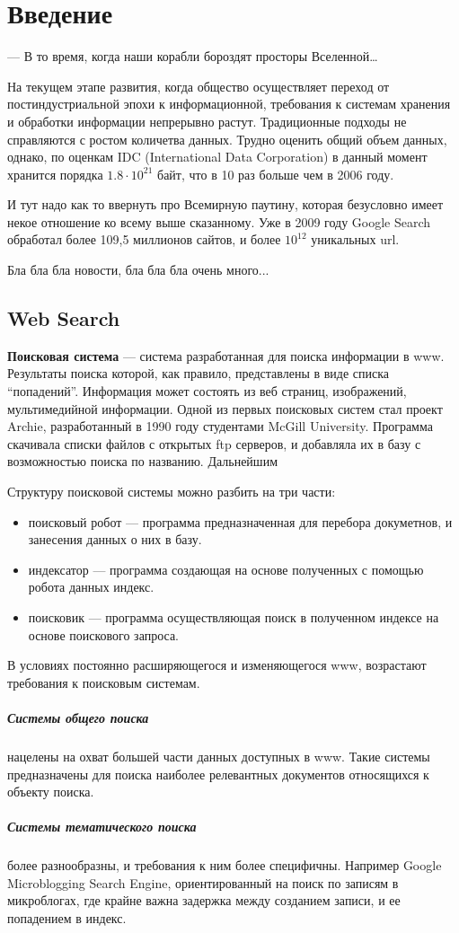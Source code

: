 \chapter{Введение} 
\epigraph{— В то время, когда наши корабли бороздят просторы
Вселенной…}{} На текущем этапе развития, когда общество осуществляет переход от
постиндустриальной эпохи к информационной, требования к системам хранения и
обработки информации непрерывно растут. Традиционные подходы не справляются с
ростом количетва данных. Трудно оценить общий объем данных, однако, по оценкам
IDC (International Data Corporation) в данный момент хранится порядка
$1.8\cdot10^{21}$ байт, что в 10 раз больше чем в 2006 году.

И тут надо как то ввернуть про Всемирную паутину, которая безусловно имеет некое
отношение ко всему выше сказанному. Уже в 2009 году Google Search обработал
более 109,5 миллионов сайтов, и более $10^{12}$ уникальных url.

Бла бла бла новости, бла бла бла очень много...

\section{Web Search} \textbf{Поисковая система} --- система разработанная для
поиска информации в www. Результаты поиска которой, как правило, представлены в
виде списка ``попадений''. Информация может состоять из веб страниц,  изображений,
мультимедийной информации. Одной из первых поисковых систем стал
проект Archie, разработанный в 1990 году студентами McGill University. Программа скачивала
списки файлов с открытых ftp серверов, и добавляла их в базу с возможностью
поиска по названию. Дальнейшим 

Структуру поисковой системы можно разбить на три части: \begin{itemize} \item
поисковый робот --- программа предназначенная для перебора докуметнов, и
занесения данных о них в базу. \item индексатор --- программа создающая на
основе полученных с помощью робота данных индекс. \item поисковик --- программа
осуществляющая поиск в полученном индексе на основе поискового запроса.
\end{itemize} В условиях постоянно расширяющегося и изменяющегося www,
возрастают требования к поисковым системам. 

\paragraph{Системы общего поиска} нацелены на охват большей части данных
доступных в www. Такие системы предназначены для поиска наиболее релевантных
документов относящихся к объекту поиска. \paragraph{Системы тематического
поиска} более разнообразны, и требования к ним более специфичны. Например Google
Microblogging Search Engine, ориентированный на поиск по записям в микроблогах,
где крайне важна задержка между созданием записи, и ее попадением в индекс.

